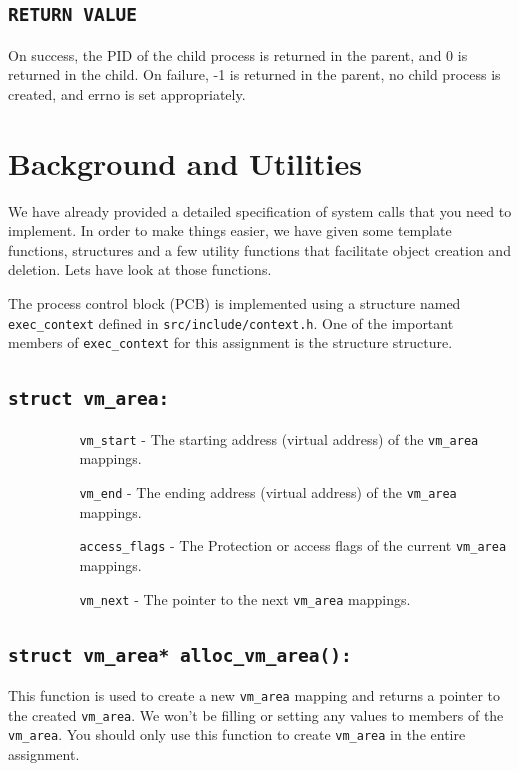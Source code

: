 \documentclass[12pt]{article}
\begin{document}
\subsection*{\texttt{RETURN VALUE}}
On success, the PID of the child process is returned in the parent, and 0 is returned in the child. On failure, -1 is returned in the parent, no child process is created, and errno  is  set appropriately.

\newpage
\section*{Background and Utilities}
We have already provided a detailed specification of system calls that you need to implement. In order to make things easier, we have given some template functions, structures and a few utility functions that facilitate object creation and deletion. Lets have look at those functions.

The process control block (PCB) is implemented using a structure named {\tt exec\_context} defined in {\tt src/include/context.h}. One of the important members of {\tt exec\_context} for this assignment is the structure structure.

\subsection*{\tt struct vm\_area:}
\begin{itemize}
    \item[]
    \begin{itemize}
        \item[]
        \begin{itemize}
                \item[{\tt  vm\_start} -] The starting address (virtual address) of the {\tt vm\_area} mappings.
                \item[{\tt  vm\_end} -] The ending address (virtual address) of the {\tt vm\_area} mappings.
                \item[{\tt  access\_flags} -] The Protection or access flags of the current {\tt vm\_area} mappings.
                \item[{\tt  vm\_next} -] The pointer to the next {\tt vm\_area} mappings.
        \end{itemize}
    \end{itemize}
\end{itemize}


\subsection*{\tt struct vm\_area* alloc\_vm\_area():}
    This function is used to create a new {\tt vm\_area} mapping and returns a pointer to the created {\tt vm\_area}. We won't be filling or setting any values to members of the {\tt vm\_area}. You should only use this function to create {\tt vm\_area} in the entire assignment.
\end{document}
